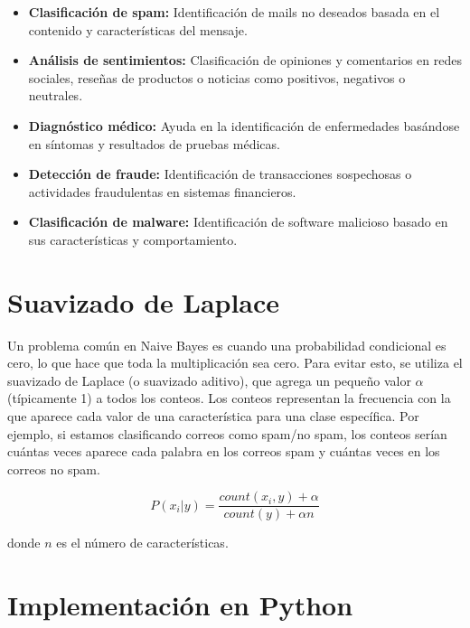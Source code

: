 \documentclass[12pt]{article}
\begin{document}
\begin{itemize}
    \item \textbf{Clasificación de spam:} Identificación de mails no deseados basada en el contenido y características del mensaje.
    
    \item \textbf{Análisis de sentimientos:} Clasificación de opiniones y comentarios en redes sociales, reseñas de productos o noticias como positivos, negativos o neutrales.
    
    \item \textbf{Diagnóstico médico:} Ayuda en la identificación de enfermedades basándose en síntomas y resultados de pruebas médicas.
    
    \item \textbf{Detección de fraude:} Identificación de transacciones sospechosas o actividades fraudulentas en sistemas financieros.
    
    \item \textbf{Clasificación de malware:} Identificación de software malicioso basado en sus características y comportamiento.
\end{itemize}

\section{Suavizado de Laplace}
Un problema común en Naive Bayes es cuando una probabilidad condicional es cero, lo que hace que toda la multiplicación sea cero. Para evitar esto, se utiliza el suavizado de Laplace (o suavizado aditivo), que agrega un pequeño valor $\alpha$ (típicamente 1) a todos los conteos. Los conteos representan la frecuencia con la que aparece cada valor de una característica para una clase específica. Por ejemplo, si estamos clasificando correos como spam/no spam, los conteos serían cuántas veces aparece cada palabra en los correos spam y cuántas veces en los correos no spam.

\[
P(x_i|y) = \frac{count(x_i, y) + \alpha}{count(y) + \alpha n}
\]

\vspace{0.5em}

donde $n$ es el número de características.

\section{Implementación en Python}
\end{document}
